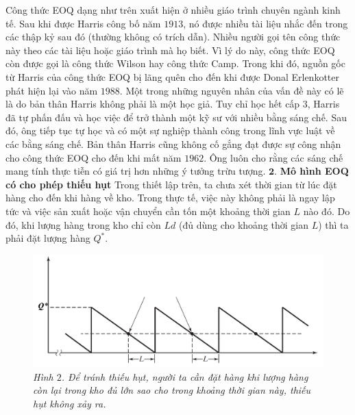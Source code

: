 \begin{multicols}{2}
\begin{figure}[H]
		\vspace*{-10pt}
	\end{figure}
	Công thức EOQ dạng như trên xuất hiện ở nhiều giáo trình chuyên ngành kinh tế. Sau khi được Harris công bố năm $1913$, nó được nhiều tài liệu nhắc đến trong các thập kỷ sau đó (thường không có trích dẫn). Nhiều người gọi tên công thức này theo các tài liệu hoặc giáo trình mà họ biết. Vì lý do này, công thức EOQ còn được gọi là công thức Wilson hay công thức Camp. Trong khi đó, nguồn gốc từ Harris của công thức EOQ bị lãng quên cho đến khi được Donal Erlenkotter phát hiện lại vào năm $1988$. Một trong những nguyên nhân của vấn đề này có lẽ là do bản thân Harris không phải là một học giả. Tuy chỉ học hết cấp $3$, Harris đã tự phấn đấu và học việc để trở thành một kỹ sư với nhiều bằng sáng chế. Sau đó, ông tiếp tục tự học và có một sự nghiệp thành công trong lĩnh vực luật về các bằng sáng chế. Bản thân Harris cũng không cố gắng đạt được sự công nhận cho công thức EOQ cho đến khi mất năm $1962$. Ông luôn cho rằng các sáng chế mang tính thực tiễn có giá trị hơn những ý tưởng trừu tượng.
	\vskip 0.1cm
	$\pmb{2.}$ \textbf{\color{toanhocdoisong}Mô hình EOQ có cho phép thiếu hụt}
	\vskip 0.1cm
	Trong thiết lập trên, ta chưa xét thời gian từ lúc đặt hàng cho đến khi hàng về kho. Trong thực tế, việc này không phải là ngay lập tức và việc sản xuất hoặc vận chuyển cần tốn một khoảng thời gian $L$ nào đó. Do đó, khi lượng hàng trong kho chỉ còn $Ld$ (đủ dùng cho khoảng thời gian $L$) thì ta phải đặt lượng hàng $Q^*$.
	\begin{figure}[H]
		\vspace*{-5pt}
		\centering
		\captionsetup{labelformat= empty, justification=centering}
		\includegraphics[width= 1\linewidth]{3}
		\caption{\small\textit{\color{toanhocdoisong}Hình $2$. Để tránh thiếu hụt, người ta cần đặt hàng khi lượng hàng còn lại trong kho đủ lớn sao cho trong khoảng thời gian này, thiếu hụt không xảy ra.}}
		\vspace*{-10pt}
	\end{figure}

\end{multicols}
